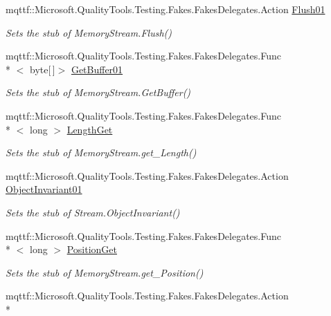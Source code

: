 \begin{DoxyCompactItemize}
mqttf\-::\-Microsoft.\-Quality\-Tools.\-Testing.\-Fakes.\-Fakes\-Delegates.\-Action \hyperlink{class_system_1_1_i_o_1_1_fakes_1_1_stub_memory_stream_a2102c8d4d71a15e87ffc96d56e6382a0}{Flush01}
\begin{DoxyCompactList}\small\item\em Sets the stub of Memory\-Stream.\-Flush()\end{DoxyCompactList}\item 
mqttf\-::\-Microsoft.\-Quality\-Tools.\-Testing.\-Fakes.\-Fakes\-Delegates.\-Func\\*
$<$ byte\mbox{[}$\,$\mbox{]}$>$ \hyperlink{class_system_1_1_i_o_1_1_fakes_1_1_stub_memory_stream_afab519eb150fbe46c84ee5739be85c54}{Get\-Buffer01}
\begin{DoxyCompactList}\small\item\em Sets the stub of Memory\-Stream.\-Get\-Buffer()\end{DoxyCompactList}\item 
mqttf\-::\-Microsoft.\-Quality\-Tools.\-Testing.\-Fakes.\-Fakes\-Delegates.\-Func\\*
$<$ long $>$ \hyperlink{class_system_1_1_i_o_1_1_fakes_1_1_stub_memory_stream_a472810df9b7c4893212b945159067387}{Length\-Get}
\begin{DoxyCompactList}\small\item\em Sets the stub of Memory\-Stream.\-get\-\_\-\-Length()\end{DoxyCompactList}\item 
mqttf\-::\-Microsoft.\-Quality\-Tools.\-Testing.\-Fakes.\-Fakes\-Delegates.\-Action \hyperlink{class_system_1_1_i_o_1_1_fakes_1_1_stub_memory_stream_af08c8016983d6c15200e037f7e7c4318}{Object\-Invariant01}
\begin{DoxyCompactList}\small\item\em Sets the stub of Stream.\-Object\-Invariant()\end{DoxyCompactList}\item 
mqttf\-::\-Microsoft.\-Quality\-Tools.\-Testing.\-Fakes.\-Fakes\-Delegates.\-Func\\*
$<$ long $>$ \hyperlink{class_system_1_1_i_o_1_1_fakes_1_1_stub_memory_stream_a05874f39d36ebfae092fd69b4785affe}{Position\-Get}
\begin{DoxyCompactList}\small\item\em Sets the stub of Memory\-Stream.\-get\-\_\-\-Position()\end{DoxyCompactList}\item 
mqttf\-::\-Microsoft.\-Quality\-Tools.\-Testing.\-Fakes.\-Fakes\-Delegates.\-Action\\*

\end{DoxyCompactItemize}
